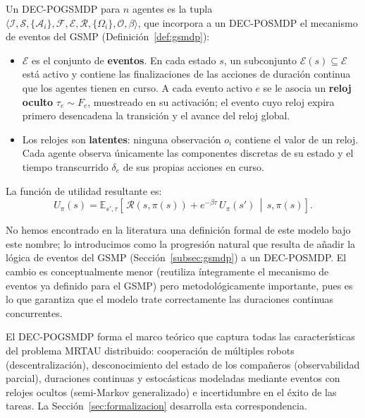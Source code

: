 \begin{definicion} \label{def:decpogsmdp} Un DEC-POGSMDP para $n$ agentes es la tupla \\ $\langle\mathcal{I}, \mathcal{S}, \{\mathcal{A}_i\}, \mathcal{F}, \mathcal{E}, \mathcal{R}, \{\Omega_i\}, \mathcal{O}, \beta\rangle$, que incorpora a un DEC-POSMDP el mecanismo de eventos del GSMP (Definición~\ref{def:gsmdp}):
\begin{itemize}
    \item $\mathcal{E}$ es el conjunto de \textbf{eventos}. En cada estado $s$, un subconjunto $\mathcal{E}(s)\subseteq\mathcal{E}$ está activo y contiene las finalizaciones de las acciones de duración continua que los agentes tienen en curso. A cada evento activo $e$ se le asocia un \textbf{reloj oculto} $\tau_e\sim F_e$, muestreado en su activación; el evento cuyo reloj expira primero desencadena la transición y el avance del reloj global.
    \item Los relojes son \textbf{latentes}: ninguna observación $o_i$ contiene el valor de un reloj. Cada agente observa únicamente las componentes discretas de su estado y el tiempo transcurrido $\delta_e$ de sus propias acciones en curso.
\end{itemize}
\end{definicion}

La función de utilidad resultante es:
\begin{equation} \label{eq:bellman-decpogsmdp} 
U_\pi(s)=\mathbb{E}_{s',\tau}\!\left[\,\mathcal{R}(s,\pi(s)) +e^{-\beta\tau}\,U_\pi(s')\,\middle|\,s,\pi(s)\right].
\end{equation}
 
No hemos encontrado en la literatura una definición formal de este modelo bajo este nombre; lo introducimos como la progresión natural que resulta de añadir la lógica de eventos del GSMP (Sección~\ref{subsec:gsmdp}) a un DEC-POSMDP. El cambio es conceptualmente menor (reutiliza íntegramente el mecanismo de eventos ya definido para el GSMP) pero metodológicamente importante, pues es lo que garantiza que el modelo trate correctamente las duraciones continuas concurrentes.
 
El DEC-POGSMDP forma el marco teórico que captura todas las características del problema MRTAU distribuido: cooperación de múltiples robots (descentralización), desconocimiento del estado de los compañeros (observabilidad parcial), duraciones continuas y estocásticas modeladas mediante eventos con relojes ocultos (semi-Markov generalizado) e incertidumbre en el éxito de las tareas. La Sección~\ref{sec:formalizacion} desarrolla esta correspondencia.

